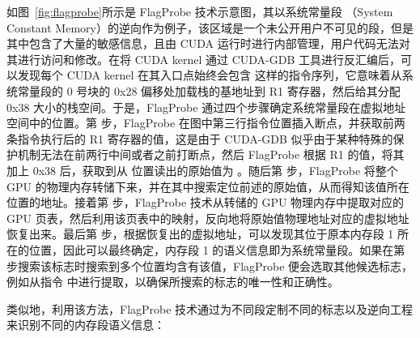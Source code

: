 如图~\ref{fig:flagprobe}所示是 FlagProbe 技术示意图，其以系统常量段 （System Constant Memory）的逆向作为例子，该区域是一个未公开用户不可见的段，但是其中包含了大量的敏感信息，且由 CUDA 运行时进行内部管理，用户代码无法对其进行访问和修改。在将 CUDA kernel 通过 CUDA-GDB 工具进行反汇编后，可以发现每个 CUDA kernel 在其入口点始终会包含  这样的指令序列，它意味着从系统常量段的 0 号块的 0x28 偏移处加载栈的基地址到 R1 寄存器，然后给其分配 0x38 大小的栈空间。于是，FlagProbe 通过四个步骤确定系统常量段在虚拟地址空间中的位置。第  步，FlagProbe 在图中第三行指令位置插入断点，并获取前两条指令执行后的 R1 寄存器的值，这是由于 CUDA-GDB 似乎由于某种特殊的保护机制无法在前两行中间或者之前打断点，然后 FlagProbe 根据 R1 的值，将其加上 0x38 后，获取到从  位置读出的原始值为 。随后第  步，FlagProbe 将整个 GPU 的物理内存转储下来，并在其中搜索定位前述的原始值，从而得知该值所在位置的地址。接着第  步，FlagProbe 技术从转储的 GPU 物理内存中提取对应的 GPU 页表，然后利用该页表中的映射，反向地将原始值物理地址对应的虚拟地址恢复出来。最后第  步，根据恢复出的虚拟地址，可以发现其位于原本内存段 1 所在的位置，因此可以最终确定，内存段 1 的语义信息即为系统常量段。如果在第  步搜索该标志时搜索到多个位置均含有该值，FlagProbe 便会选取其他候选标志，例如从指令  中进行提取，以确保所搜索的标志的唯一性和正确性。

类似地，利用该方法，FlagProbe 技术通过为不同段定制不同的标志以及逆向工程来识别不同的内存段语义信息：

